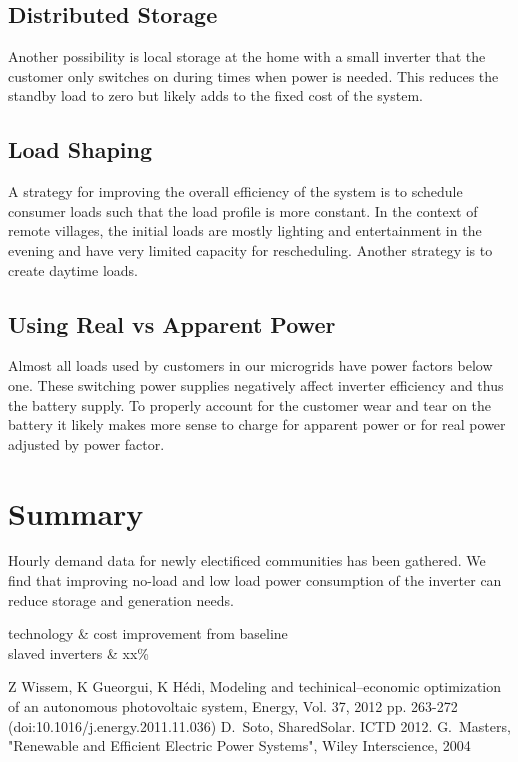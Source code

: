 \documentclass[conference]{IEEEtran}
\begin{document}
\subsection{Distributed Storage}
Another possibility is local storage at the home with a small inverter
that the customer only switches on during times when power
is needed.
This reduces the standby load to zero but likely adds to the
fixed cost of the system.

\subsection{Load Shaping}

A strategy for improving the overall efficiency of the system
is to schedule consumer loads such that the load profile is
more constant.
In the context of remote villages, the initial loads are mostly
lighting and entertainment in the evening and have very limited
capacity for rescheduling.
Another strategy is to create daytime loads.


\subsection{Using Real vs Apparent Power}
Almost all loads used by customers in our microgrids have power
factors below one.
These switching power supplies negatively affect inverter efficiency
and thus the battery supply.
To properly account for the customer wear and tear on the battery
it likely makes more sense to charge for apparent power or for
real power adjusted by power factor.

\section{Summary}
Hourly demand data for newly electificed communities has been gathered.
We find that improving no-load and low load power consumption of the
inverter can reduce storage and generation needs.

technology \& cost improvement from baseline \\
slaved inverters \& xx\% \\


\begin{thebibliography}{1}
Z Wissem, K Gueorgui, K H\'edi,
Modeling and techinical--economic optimization of an autonomous
photovoltaic system,
Energy, Vol. 37, 2012 pp. 263-272
(doi:10.1016/j.energy.2011.11.036)
D.~Soto, SharedSolar. ICTD 2012.
G.~Masters,
"Renewable and Efficient Electric Power Systems",
Wiley Interscience,
2004
\end{thebibliography}
\end{document}
